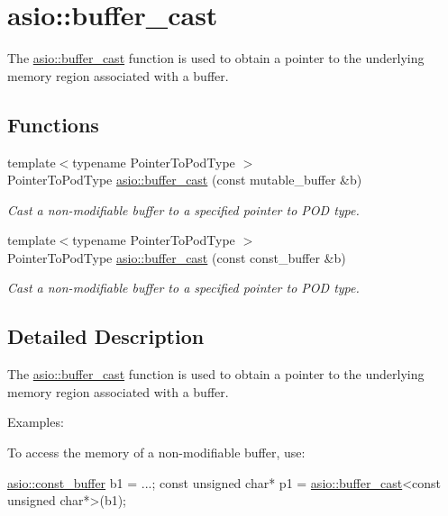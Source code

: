 \hypertarget{group__buffer__cast}{}\section{asio\+:\+:buffer\+\_\+cast}
\label{group__buffer__cast}


The \hyperlink{group__buffer__cast_ga6faa5f9daa2512cc9c3cefa8b5ab0704}{asio\+::buffer\+\_\+cast} function is used to obtain a pointer to the underlying memory region associated with a buffer.  


\subsection*{Functions}
\begin{DoxyCompactItemize}
\item 
{\footnotesize template$<$typename Pointer\+To\+Pod\+Type $>$ }\\Pointer\+To\+Pod\+Type \hyperlink{group__buffer__cast_ga6faa5f9daa2512cc9c3cefa8b5ab0704}{asio\+::buffer\+\_\+cast} (const mutable\+\_\+buffer \&b)
\begin{DoxyCompactList}\small\item\em Cast a non-\/modifiable buffer to a specified pointer to P\+O\+D type. \end{DoxyCompactList}\item 
{\footnotesize template$<$typename Pointer\+To\+Pod\+Type $>$ }\\Pointer\+To\+Pod\+Type \hyperlink{group__buffer__cast_ga0bc1fdf63b08b041819a9e18423ef630}{asio\+::buffer\+\_\+cast} (const const\+\_\+buffer \&b)
\begin{DoxyCompactList}\small\item\em Cast a non-\/modifiable buffer to a specified pointer to P\+O\+D type. \end{DoxyCompactList}\end{DoxyCompactItemize}


\subsection{Detailed Description}
The \hyperlink{group__buffer__cast_ga6faa5f9daa2512cc9c3cefa8b5ab0704}{asio\+::buffer\+\_\+cast} function is used to obtain a pointer to the underlying memory region associated with a buffer. 

\begin{DoxyParagraph}{Examples\+:}

\end{DoxyParagraph}
To access the memory of a non-\/modifiable buffer, use\+: 
\begin{DoxyCode}
 \hyperlink{classasio_1_1const__buffer}{asio::const\_buffer} b1 = ...;
\textcolor{keyword}{const} \textcolor{keywordtype}{unsigned} \textcolor{keywordtype}{char}* p1 = \hyperlink{group__buffer__cast_ga6faa5f9daa2512cc9c3cefa8b5ab0704}{asio::buffer\_cast}<\textcolor{keyword}{const} \textcolor{keywordtype}{unsigned} \textcolor{keywordtype}{char}*>(b1);
\end{DoxyCode}


